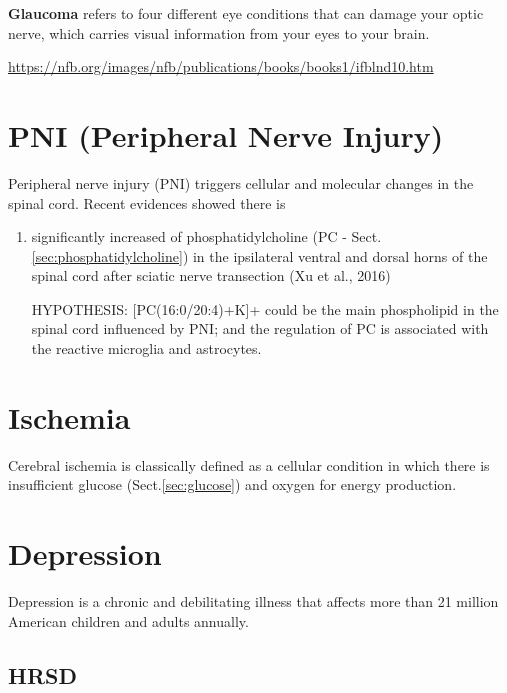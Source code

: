 {\bf Glaucoma} refers to four different eye conditions that can damage your
optic nerve, which carries visual information from your eyes to your brain.

\url{https://nfb.org/images/nfb/publications/books/books1/ifblnd10.htm}


\section{PNI (Peripheral Nerve Injury)}
\label{sec:PNI}

Peripheral nerve injury (PNI) triggers cellular and molecular changes in the
spinal cord. Recent evidences showed there is
\begin{enumerate}
  \item significantly increased of phosphatidylcholine (PC -
  Sect.\ref{sec:phosphatidylcholine})  in  the ipsilateral ventral and dorsal
  horns of the spinal cord after sciatic nerve transection (Xu et al., 2016)
  
HYPOTHESIS: [PC(16:0/20:4)+K]+ could be the main phospholipid in the spinal cord
influenced by PNI; and the regulation of PC is associated with the reactive
microglia and astrocytes.
  
\end{enumerate}

\section{Ischemia}
\label{sec:ischemia}

Cerebral ischemia is classically defined as a cellular condition in which there
is insufficient glucose (Sect.\ref{sec:glucose}) and oxygen for energy
production.

\section{Depression}
\label{sec:depression}

Depression is a chronic and debilitating illness that affects more than 21
million American children and adults annually.

\subsection{HRSD}
\label{sec:HRSP-depression-score}

